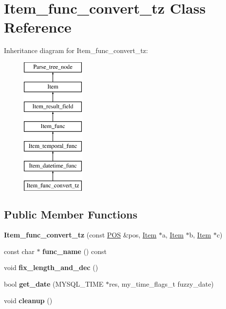 \hypertarget{classItem__func__convert__tz}{}\section{Item\+\_\+func\+\_\+convert\+\_\+tz Class Reference}
\label{classItem__func__convert__tz}
Inheritance diagram for Item\+\_\+func\+\_\+convert\+\_\+tz\+:\begin{figure}[H]
\begin{center}
\leavevmode
\includegraphics[height=7.000000cm]{classItem__func__convert__tz}
\end{center}
\end{figure}
\subsection*{Public Member Functions}
\begin{DoxyCompactItemize}
\item 
\mbox{\label{classItem__func__convert__tz_ac43cc98e619909d25b45bfb20f1648ea}} 
{\bfseries Item\+\_\+func\+\_\+convert\+\_\+tz} (const \mbox{\hyperlink{structYYLTYPE}{P\+OS}} \&pos, \mbox{\hyperlink{classItem}{Item}} $\ast$a, \mbox{\hyperlink{classItem}{Item}} $\ast$b, \mbox{\hyperlink{classItem}{Item}} $\ast$c)
\item 
\mbox{\label{classItem__func__convert__tz_aa293bd1d5cd476fe84080fd8b9c941f5}} 
const char $\ast$ {\bfseries func\+\_\+name} () const
\item 
\mbox{\label{classItem__func__convert__tz_a7ef338845af5c45d1ee3cf625d9cecdb}} 
void {\bfseries fix\+\_\+length\+\_\+and\+\_\+dec} ()
\item 
\mbox{\label{classItem__func__convert__tz_ab8ab9c2ecb0f7667fff4db91ae90916d}} 
bool {\bfseries get\+\_\+date} (M\+Y\+S\+Q\+L\+\_\+\+T\+I\+ME $\ast$res, my\+\_\+time\+\_\+flags\+\_\+t fuzzy\+\_\+date)
\item 
\mbox{\label{classItem__func__convert__tz_ab0bebb0ee3fa49923ec06aac8cf98260}} 
void {\bfseries cleanup} ()
\end{DoxyCompactItemize}
